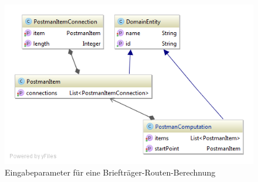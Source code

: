 \begin{figure}[h]
\centering
\includegraphics[scale=0.5]{images/probleme/postman.png}
\caption[Eingabeparameter für eine Briefträger-Routen-Berechnung]{Eingabeparameter für eine Briefträger-Routen-Berechnung \selfmade{}}
\label{fig:postman_input}
\end{figure}

\FloatBarrier
%
%
%
%

